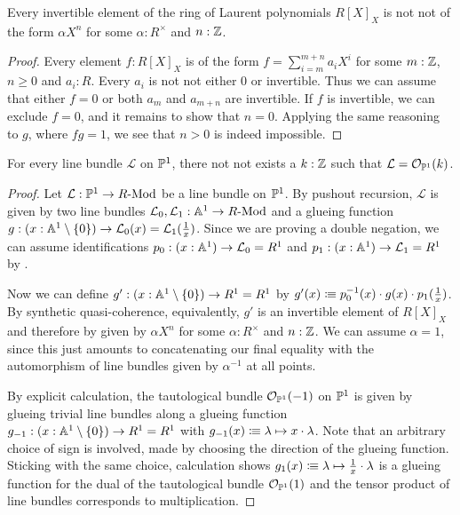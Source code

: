 \begin{lemma}
  \label{invertible-laurent-polynomials}
  Every invertible element of the ring of Laurent polynomials $R[X]_X$
  is not not of the form $\alpha X^n$
  for some $\alpha : R^{\times}$ and $n : \mathbb{Z}$.
\end{lemma}

\begin{proof}
  Every element $f : R[X]_X$ is of the form
  $f = \sum_{i = m}^{m + n} a_i X^i$
  for some $m : \mathbb{Z}$, $n \geq 0$ and $a_i : R$.
  Every $a_i$ is not not either $0$ or invertible.
  Thus we can assume that either $f = 0$ or
  both $a_m$ and $a_{m+n}$ are invertible.
  If $f$ is invertible, we can exclude $f = 0$,
  and it remains to show that $n = 0$.
  Applying the same reasoning to $g$,
  where $fg = 1$,
  we see that $n > 0$ is indeed impossible.
\end{proof}

\begin{theorem}
  For every line bundle $\mathcal{L}$ on $\mathbb{P}^1$,
  there not not exists a $k : \mathbb{Z}$
  such that $\mathcal{L} = \mathcal{O}_{\mathbb{P}^1}(k)$.
\end{theorem}

\begin{proof}
  Let $\mathcal{L}:\mathbb{P}^1\to R\text{-}\mathrm{Mod}$ be a line bundle on $\mathbb{P}^1$.
  By pushout recursion, $\mathcal{L}$ is given by two line bundles $\mathcal L_0,\mathcal L_1:\mathbb{A}^1\to R\text{-}\mathrm{Mod}$
  and a glueing function $g:(x:\mathbb{A}^1\setminus\{0\})\to \mathcal L_0(x)=\mathcal L_1(\frac{1}{x})$.
  Since we are proving a double negation, we can assume identifications $p_0:(x:\mathbb{A}^1)\to \mathcal L_0=R^1$
  and $p_1:(x:\mathbb{A}^1)\to \mathcal L_1=R^1$ by .

  Now we can define $g':(x:\mathbb{A}^1\setminus\{0\})\to R^1=R^1$ by $g'(x)\vcentcolon\mspace{-1.2mu}\equiv p_0^{-1}(x)\cdot g(x)\cdot p_1(\frac{1}{x})$.
  By synthetic quasi-coherence, equivalently, $g'$ is an invertible element of $R[X]_X$
  and therefore by  given by $\alpha X^n$ for some $\alpha:R^\times$ and $n:\mathbb{Z}$.
  We can assume $\alpha=1$, since this just amounts to concatenating
  our final equality with the automorphism of line bundles given by $\alpha^{-1}$ at all points.

  By explicit calculation, the tautological bundle $\mathcal O_{\mathbb{P}^1}(-1)$ on $\mathbb{P}^1$ is given by glueing trivial line bundles along
  a glueing function $g_{-1}:(x:\mathbb{A}^1\setminus\{0\})\to R^1=R^1$ with $g_{-1}(x)\vcentcolon\mspace{-1.2mu}\equiv \lambda\mapsto x\cdot \lambda$.
  Note that an arbitrary choice of sign is involved, made by choosing the direction of the glueing function.
  Sticking with the same choice, calculation shows $g_1(x)\vcentcolon\mspace{-1.2mu}\equiv \lambda\mapsto \frac{1}{x}\cdot \lambda$
  is a glueing function for the dual of the tautological bundle $\mathcal O_{\mathbb{P}^1}(1)$
  and the tensor product of line bundles corresponds to multiplication.
\end{proof}
